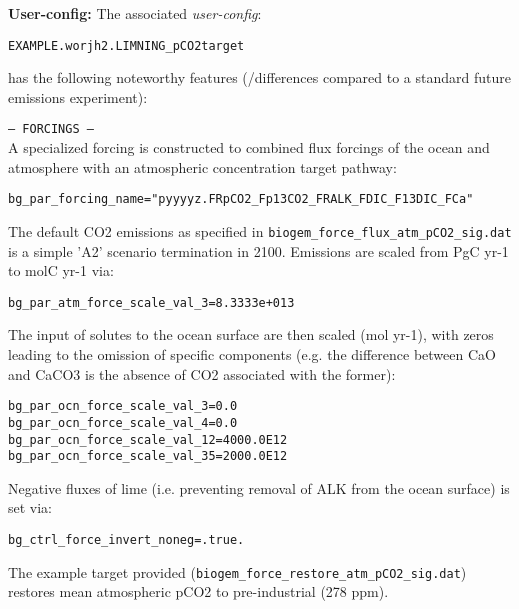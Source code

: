 \documentclass[10pt,twoside]{article}
\begin{document}
\noindent \textbf{User-config:} The associated \textit{user-config}:
\vspace{-10pt}\begin{verbatim}EXAMPLE.worjh2.LIMNING_pCO2target\end{verbatim}\vspace{-10pt}
has the following noteworthy features (/differences compared to a standard future emissions experiment):
\begin{compactitem}
                \item \texttt{--- FORCINGS ---}
                \\ A specialized forcing is constructed to combined flux forcings of the ocean and atmosphere with an atmospheric concentration target pathway:
\vspace{-5pt}\begin{verbatim}
bg_par_forcing_name="pyyyyz.FRpCO2_Fp13CO2_FRALK_FDIC_F13DIC_FCa"
                \end{verbatim}\vspace{-5pt}
The default CO2 emissions as specified in \texttt{biogem\_force\_flux\_atm\_pCO2\_sig.dat} is a simple 'A2' scenario termination in 2100. Emissions are scaled from PgC yr-1 to molC yr-1 via:
\vspace{-5pt}\begin{verbatim}
bg_par_atm_force_scale_val_3=8.3333e+013
                \end{verbatim}\vspace{-5pt}
                The input of solutes to the ocean surface are then scaled (mol yr-1), with zeros leading to the omission of specific components (e.g. the difference between CaO and CaCO3 is the absence of CO2 associated with the former):
\vspace{-5pt}\begin{verbatim}
bg_par_ocn_force_scale_val_3=0.0
bg_par_ocn_force_scale_val_4=0.0
bg_par_ocn_force_scale_val_12=4000.0E12
bg_par_ocn_force_scale_val_35=2000.0E12
                \end{verbatim}\vspace{-5pt}
Negative fluxes of lime (i.e. preventing removal of ALK from the ocean surface) is set via:
\vspace{-5pt}\begin{verbatim}
bg_ctrl_force_invert_noneg=.true.
                \end{verbatim}\vspace{-5pt}
                The example target provided (\texttt{biogem\_force\_restore\_atm\_pCO2\_sig.dat}) restores mean atmospheric pCO2 to pre-industrial (278 ppm).
        \end{compactitem}
        
\end{document}
